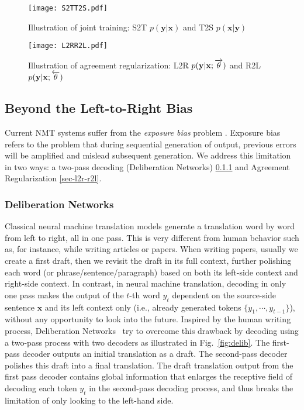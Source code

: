 \documentclass[a4paper]{article}
\begin{document}
\begin{CJK*}{UTF8}{gbsn}
\begin{figure}
    \centering
    \begin{minipage}[t]{0.48\textwidth}\centering \texttt{[image: S2TT2S.pdf]}
  		\caption{Illustration of joint training: S2T $p(\mathbf{y}| \mathbf{x})$ and T2S $p(\mathbf{x}|\mathbf{y})$}
  \label{fig:S2TT2S}
    \end{minipage}\hfill
    \begin{minipage}[t]{0.48\textwidth}\centering \texttt{[image: L2RR2L.pdf]}
		\caption{Illustration of agreement regularization: L2R $p(\mathbf{y}|\mathbf{x};\protect\overrightarrow{\theta})$ and R2L $p(\mathbf{y}|\mathbf{x};\protect\overleftarrow{\theta})$}
		\label{fig:L2RR2L}
	\end{minipage}
\end{figure}
 \subsection{Beyond the Left-to-Right Bias}
\label{sec.delb}

Current NMT systems suffer from the {\em exposure bias} problem \cite{bengio2015scheduled}. Exposure bias refers to the problem that during sequential generation of output, previous errors will be amplified and mislead subsequent generation. We address this limitation in two ways: a two-pass decoding (Deliberation Networks) \ref{sec.dn} and Agreement Regularization \ref{sec-l2r-r2l}.

\subsubsection{Deliberation Networks}
\label{sec.dn}
Classical neural machine translation models generate a translation word by word from left to right, all in one pass. This is very different from human behavior such as, for instance, while writing articles or papers. When writing papers, usually we create a first draft, then we revisit the draft in its full context, further polishing each word (or phrase/sentence/paragraph) based on both its left-side context and right-side context. In contrast, in neural machine translation, decoding in only one pass makes the output of the $t$-th word $y_t$ dependent on the source-side sentence $\mathbf{x}$ and its left context only (i.e., already generated tokens $\{y_1,\cdots,y_{t-1}\}$), without any opportunity to look into the future. Inspired by the human writing process, Deliberation Networks~\cite{delibnet} try to overcome this drawback by decoding using a two-pass process with two decoders as illustrated in Fig.~\ref{fig:delib}. The first-pass decoder outputs an initial translation as a draft. The second-pass decoder polishes this draft into a final translation. The draft translation output from the first pass decoder contains global information that enlarges the receptive field of decoding each token $y_t$ in the second-pass decoding process, and thus breaks the limitation of only looking to the left-hand side. 


\end{CJK*}
\end{document}
